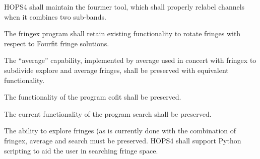 \begin{description}
 HOPS4 shall maintain the \acs{fourmer} tool, which shall properly
relabel channels when it combines two sub-bands.

 The \acs{fringex} program shall retain existing functionality to rotate
fringes with respect to Fourfit fringe solutions.

 The ``average'' capability, implemented by \acs{average} used in
concert with \acs{fringex} to subdivide explore and average fringes, shall be
preserved with equivalent functionality.

 The functionality of the program \acs{cofit} shall be preserved.

 The current functionality of the program \acs{search} shall be
preserved.


 The ability to explore fringes (as is currently done with the
combination of \acs{fringex}, \acs{average} and search must be preserved.
HOPS4 shall support \acs{Python} scripting to aid the user in searching
fringe space.



\end{description}
